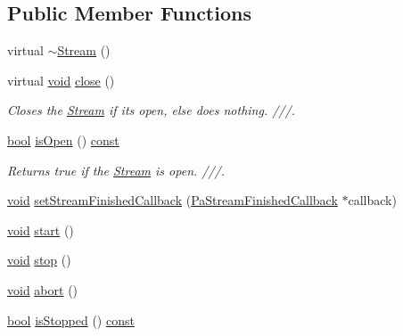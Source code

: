 \subsection*{Public Member Functions}
\begin{DoxyCompactItemize}
\item 
virtual \hyperlink{classportaudio_1_1_stream_a2f817fa08f53b6bfd5b21cd1e4ff8017}{$\sim$\+Stream} ()
\item 
virtual \hyperlink{sound_8c_ae35f5844602719cf66324f4de2a658b3}{void} \hyperlink{classportaudio_1_1_stream_acb79f85f43b9f87b1e3c495d5f02ae58}{close} ()
\begin{DoxyCompactList}\small\item\em Closes the \hyperlink{classportaudio_1_1_stream}{Stream} if it\textquotesingle{}s open, else does nothing. ///. \end{DoxyCompactList}\item 
\hyperlink{mac_2config_2i386_2lib-src_2libsoxr_2soxr-config_8h_abb452686968e48b67397da5f97445f5b}{bool} \hyperlink{classportaudio_1_1_stream_ad5abdf9dda1853fa37bbefca9915978e}{is\+Open} () \hyperlink{getopt1_8c_a2c212835823e3c54a8ab6d95c652660e}{const} 
\begin{DoxyCompactList}\small\item\em Returns true if the \hyperlink{classportaudio_1_1_stream}{Stream} is open. ///. \end{DoxyCompactList}\item 
\hyperlink{sound_8c_ae35f5844602719cf66324f4de2a658b3}{void} \hyperlink{classportaudio_1_1_stream_af8ce6e44b26fbb06c2cc997400bb0190}{set\+Stream\+Finished\+Callback} (\hyperlink{portaudio_8h_ab2530ee0cb756c67726f9074d3482ef2}{Pa\+Stream\+Finished\+Callback} $\ast$callback)
\item 
\hyperlink{sound_8c_ae35f5844602719cf66324f4de2a658b3}{void} \hyperlink{classportaudio_1_1_stream_aa6d924b80c15d05c44462c013ede4b82}{start} ()
\item 
\hyperlink{sound_8c_ae35f5844602719cf66324f4de2a658b3}{void} \hyperlink{classportaudio_1_1_stream_a24215c2e6e1da8784ba4fdc5ada5870b}{stop} ()
\item 
\hyperlink{sound_8c_ae35f5844602719cf66324f4de2a658b3}{void} \hyperlink{classportaudio_1_1_stream_a318edab97a30e0b5101c70e993efc1b5}{abort} ()
\item 
\hyperlink{mac_2config_2i386_2lib-src_2libsoxr_2soxr-config_8h_abb452686968e48b67397da5f97445f5b}{bool} \hyperlink{classportaudio_1_1_stream_ada2dbfeb07d901c0a5e554706886751b}{is\+Stopped} () \hyperlink{getopt1_8c_a2c212835823e3c54a8ab6d95c652660e}{const} 

\end{DoxyCompactItemize}
